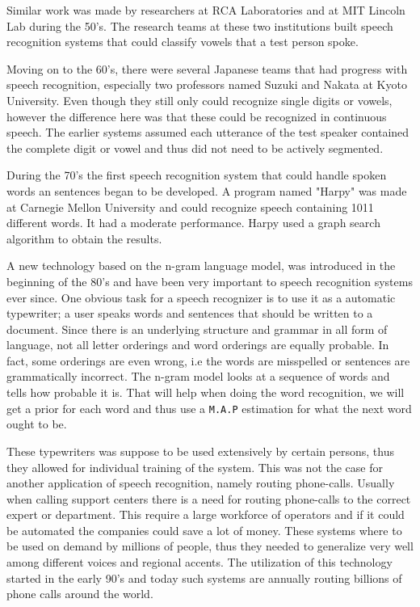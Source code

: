 \documentclass[a4paper,12pt,twoside]{ltxdoc}
\begin{document}
Similar work was made by researchers at RCA Laboratories and at MIT Lincoln Lab during the 50's. The research teams at these two institutions built speech recognition systems that could classify vowels that a test person spoke.

Moving on to the 60's, there were several Japanese teams that had progress with speech recognition, especially two professors named Suzuki and Nakata at Kyoto University. Even though they still only could recognize single digits or vowels, however the difference here was that these could be recognized in continuous speech. The earlier systems assumed each utterance of the test speaker contained the complete digit or vowel and thus did not need to be actively segmented.  

During the 70's the first speech recognition system that could handle spoken words an sentences began to be developed. A program named "Harpy" was made at Carnegie Mellon University and could recognize speech containing 1011 different words. It had a moderate performance. Harpy used a graph search algorithm to obtain the results. 

A new technology based on the n-gram language model, was introduced in the beginning of the 80's and have been very important to speech recognition systems ever since. One obvious task for a speech recognizer is to use it as a automatic typewriter; a user speaks words and sentences that should be written to a document. Since there is an underlying structure and grammar in all form of language, not all letter orderings and word orderings are equally probable. In fact, some orderings are even wrong, i.e the words are misspelled or sentences are grammatically incorrect. The n-gram model looks at a sequence of words and tells how probable it is. That will help when doing the word recognition, we will get a prior for each word and thus use a \verb#M.A.P# estimation for what the next word ought to be.

These typewriters was suppose to be used extensively by certain persons, thus they allowed for individual training of the system. This was not the case for another application of speech recognition, namely routing phone-calls. Usually when calling support centers there is a need for routing phone-calls to the correct expert or department. This require a large workforce of operators and if it could be automated the companies could save a lot of money. These systems where to be used on demand by millions of people, thus they needed to generalize very well among different voices and regional accents. The utilization of this technology started in the early 90's and today such systems are annually routing billions of phone calls around the world. 
\end{document}

